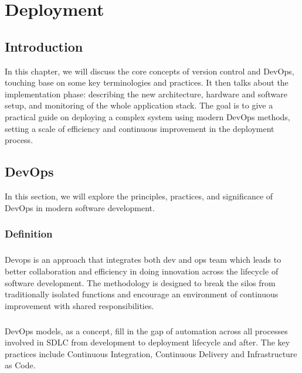 \chapter{Deployment}


\setcounter{secnumdepth}{0} %
\section{Introduction}
In this chapter, we will discuss the core concepts of version control and DevOps, touching base on some key terminologies and practices. It then talks about the implementation phase: describing the new architecture, hardware and software setup, and monitoring of the whole application stack.
\newline
The goal is to give a practical guide on deploying a complex system using modern DevOps methods, setting a scale of efficiency and continuous improvement in the deployment process.

\setcounter{secnumdepth}{3} 
\section{DevOps}
In this section, we will explore the principles, practices, and significance of DevOps in modern software development.
\subsection{Definition}
\paragraph*{}
Devops is an approach that integrates both dev and ops team which leads to better collaboration and efficiency in doing innovation across the lifecycle of software development.
\newline
The methodology is designed to break the silos from traditionally isolated functions and encourage an environment of continuous improvement with shared responsibilities.
\paragraph*{}
DevOps models, as a concept, fill in the gap of automation across all processes involved in SDLC from development to deployment lifecycle and after. The key practices include Continuous Integration, Continuous Delivery and Infrastructure as Code.

